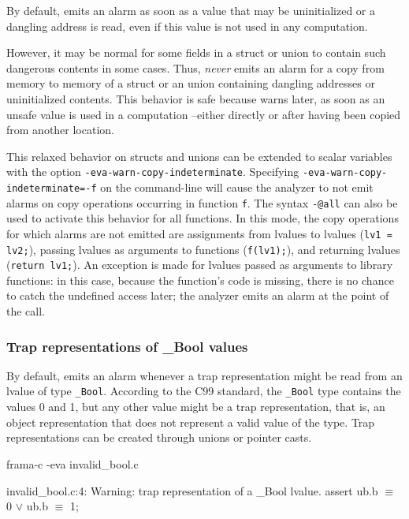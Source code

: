 \documentclass{frama-c-book}
\newcommand{\isoc}{\textsf{C99}}
\begin{document}
By default, \Eva{} emits an alarm as soon as a value that may be uninitialized
or a dangling address is read, even if this value is not used in any computation.

However, it may be normal for some fields in a struct or union to contain
such dangerous contents in some cases.
Thus, \Eva{} \emph{never} emits an alarm for a copy from memory to memory
of a struct or an union containing dangling addresses or uninitialized contents.
This behavior is safe because \Eva{} warns later, as soon as an unsafe value is
used in a computation --either directly or after having been copied from another
location.

This relaxed behavior on structs and unions can be extended to scalar variables
with the option \lstinline|-eva-warn-copy-indeterminate|.
Specifying \lstinline|-eva-warn-copy-indeterminate=-f| on the command-line
will cause the analyzer to not emit alarms on copy operations occurring in
function \lstinline|f|. The syntax \lstinline|-@all| can also be used to
activate this behavior for all functions.
In this mode, the copy operations for which alarms are not emitted are
assignments from lvalues to lvalues (\lstinline|lv1 = lv2;|), passing lvalues
as arguments to functions (\lstinline|f(lv1);|), and returning
lvalues (\lstinline|return lv1;|). An exception is made
for lvalues passed as arguments to library functions: in this case,
because the function's code is missing, there is no chance to catch
the undefined access later; the analyzer emits an alarm at the point
of the call.

\subsubsection{Trap representations of \_Bool values}

By default, \Eva{} emits an alarm whenever a trap representation might be read
from an lvalue of type \texttt{\_Bool}.
According to the \isoc{} standard, the \texttt{\_Bool} type contains
the values 0 and 1, but any other value might be a trap representation, that is,
an object representation that does not represent a valid value of the type.
Trap representations can be created through unions or pointer casts.

\begin{frama-c-commands}
frama-c -eva invalid_bool.c
\end{frama-c-commands}
\begin{logsmath}
   invalid_bool.c:4: Warning:
    trap representation of a _Bool lvalue. assert ub.b $\equiv$ 0 $\vee$ ub.b $\equiv$ 1;
\end{logsmath}
\end{document}
